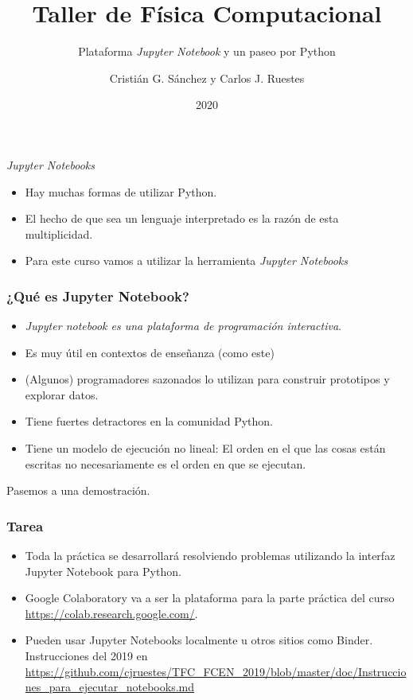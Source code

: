 \documentclass{beamer}
\title{Taller de Física Computacional}
\subtitle{Plataforma {\em Jupyter Notebook} y un paseo por Python}
\author{Cristián G. Sánchez y Carlos J. Ruestes}
\date{2020}
\begin{document}
\frame{\titlepage}

\begin{frame}
\begin{block}{\em Jupyter Notebooks}
\begin{itemize}
\item Hay muchas formas de utilizar Python.
\item El hecho de que sea un lenguaje interpretado es la razón de esta multiplicidad.
\item Para este curso vamos a utilizar la herramienta {\em Jupyter Notebooks}
\end{itemize}
\end{block}
\end{frame}

\begin{frame}
\frametitle{¿Qué es Jupyter Notebook?}
\begin{itemize}
\item {\em Jupyter notebook es una plataforma de {\em programación interactiva}}. 
\item Es muy útil en contextos de enseñanza (como este) 
\item (Algunos) programadores sazonados lo utilizan para construir prototipos y explorar datos.
\item Tiene fuertes detractores en la comunidad Python.
\item Tiene un modelo de ejecución \alert{no lineal}: El orden en el que las cosas están escritas no necesariamente es el orden en que se ejecutan.
\end{itemize}
\end{frame}

\begin{frame}[plain,c]

Pasemos a una demostración.

\end{frame}

\begin{frame}
\frametitle{Tarea}

\begin{itemize}
\item Toda la práctica se desarrollará resolviendo problemas utilizando la interfaz Jupyter Notebook para Python.
\item Google Colaboratory va a ser la plataforma para la parte práctica del curso \url{https://colab.research.google.com/}.
\item Pueden usar Jupyter Notebooks localmente u otros sitios como Binder. Instrucciones del 2019 en \url{https://github.com/cjruestes/TFC_FCEN_2019/blob/master/doc/Instrucciones_para_ejecutar_notebooks.md} 
\end{itemize}
\end{frame}
\end{document}
